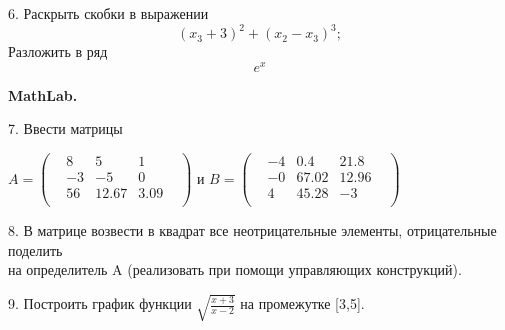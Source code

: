 \documentclass[11pt]{article}
\begin{document}
6. Раскрыть скобки в выражении\\ 	
\begin {equation*}
	{(x_3+3)}^2+{(x_2-x_3)^3};
\end {equation*}
Разложить в ряд $$e^x$$

\begin{center}\bf MathLab. \rm\end{center}

7. Ввести матрицы\\
\begin {center}
	$ A =
	\begin{pmatrix} 
		& 8 & 5 & 1 &\\
		& -3 & -5 & 0 &\\
		& 56 & 12.67 & 3.09 &\\
	\end{pmatrix}
	$
	и
	$ B =
	\begin{pmatrix} 
		& -4 & 0.4 & 21.8 &\\
		& -0 & 67.02 & 12.96 &\\
		& 4 & 45.28 & -3 &\\
	\end{pmatrix}
	$
\end {center}

8. В матрице возвести в квадрат все неотрицательные элементы, отрицательные поделить
	\\на определитель A (реализовать при помощи управляющих конструкций).

9. Построить график функции $ \sqrt{\frac{x+3}{x-2}} $ на промежутке [3,5].
\end{document}
